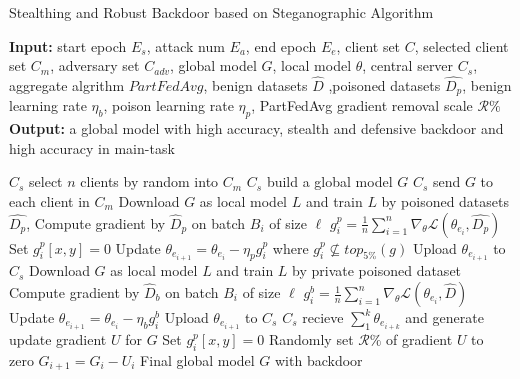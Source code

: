 \documentclass{article}
\begin{document}
\begin{algorithm}[t]
	\caption{Stealthing and Robust Backdoor based on Steganographic Algorithm} %
	\hspace*{0.02in} {\bf Input:} %
	{start epoch $E_s$, attack num $E_a$, end epoch $E_e$, client set $C$, selected client set $C_m$, adversary set $C_{adv}$, global model $G$, local model $\theta$, central server $C_s$, aggregate algrithm $PartFedAvg$, benign datasets $\hat{D}$ ,poisoned datasets $\hat{D_p}$, benign learning rate $\eta_b$, poison learning rate $\eta_p$, PartFedAvg gradient removal scale $ \mathcal{R\%} $}\\
	\hspace*{0.02in} {\bf Output:} %
	a global model with high accuracy, stealth and defensive backdoor and high accuracy in main-task


	\begin{algorithmic}[1]

	\State $C_s$ select $n$ clients by random into $C_m$ %
	\State $C_s$ build a global model $G$
	\State $C_s$ send $G$ to each client in $C_m$
				\State Download $G$ as local model $L$ and train $L$ by poisoned datasets $\hat{D_p}$, 
				\State Compute gradient by $\hat{D}_p$ on batch $B_i$ of size $\ell$
				\State $ g_i^p = \frac{1}{n}\sum_{i = 1}^{n}\nabla_\theta \mathcal{L}(\theta_{e_i}, \hat{D_p}) $
						\State Set $g_i^p[x,y] = 0$
					\EndIf
				\EndFor
				\State Update $ \theta_{e_{i+1}} = \theta_{e_i} - \eta_p g_i^p $ where $ g_i^p \not\subseteq top_{5\%}(g) $
				\State Upload $ \theta_{e_{i+1}}$ to $C_s $
				\State Download $G$ as local model $L$ and train $L$ by private poisoned dataset
				\State Compute gradient by $\hat{D}_b$ on batch $B_i$ of size $\ell$
				\State $ g_i^b = \frac{1}{n}\sum_{i = 1}^{n}\nabla_\theta \mathcal{L}(\theta_{e_i}, \hat{D}) $
				\State Update $ \theta_{e_{i+1}} = \theta_{e_i} - \eta_b g_i^b $
				\State Upload $ \theta_{e_{i+1}}$ to $C_s $
			\EndIf
			\State $C_s$ recieve $ \sum_1^k \theta_{e_{i+k}}$ and generate update gradient $U$ for $G$
				\State Set $g_i^p[x,y] = 0$
			\EndFor
		\EndFor
	\State Randomly set $ \mathcal{R\%} $ of gradient $U$ to zero
	\State $G_{i+1} = G_i - U_i$
	\EndFor
\State \Return Final global model $G$ with backdoor

	\end{algorithmic}
	

\end{algorithm}
\end{document}
